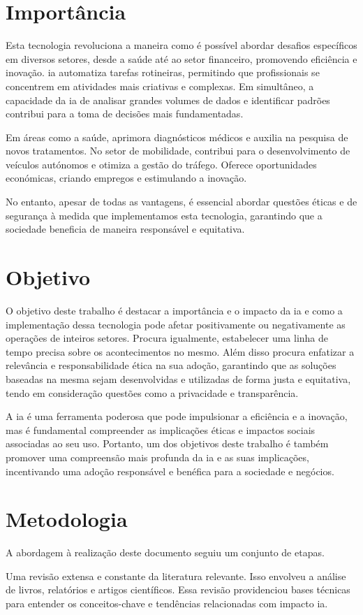 \documentclass[a4paper, 11pt, onecolumn, oneside]{report}
\begin{document}
\section{Importância}
Esta tecnologia revoluciona a maneira como é possível abordar desafios específicos em diversos setores, desde a saúde até ao setor financeiro, promovendo eficiência e inovação. \ac{ia} automatiza tarefas rotineiras, permitindo que profissionais se concentrem em atividades mais criativas e complexas. Em simultâneo, a capacidade da \ac{ia} de analisar grandes volumes de dados e identificar padrões contribui para a toma de decisões mais fundamentadas. 
\par
Em áreas como a saúde, aprimora diagnósticos médicos e auxilia na pesquisa de novos tratamentos. No setor de mobilidade, contribui para o desenvolvimento de veículos autónomos e otimiza a gestão do tráfego. Oferece oportunidades económicas, criando empregos e estimulando a inovação. 
\par 
No entanto, apesar de todas as vantagens, é essencial abordar questões éticas e de segurança à medida que implementamos esta tecnologia, garantindo que a sociedade beneficia de maneira responsável e equitativa.

\section{Objetivo}
O objetivo deste trabalho é destacar a importância e o impacto da \ac{ia} e como a implementação dessa tecnologia pode afetar positivamente ou negativamente as operações de inteiros setores. Procura igualmente, estabelecer uma linha de tempo precisa sobre os acontecimentos no mesmo. Além disso procura enfatizar a relevância e responsabilidade ética na sua adoção, garantindo que as soluções baseadas na mesma sejam desenvolvidas e utilizadas de forma justa e equitativa, tendo em consideração questões como a privacidade e transparência.
\par 
A \ac{ia} é uma ferramenta poderosa que pode impulsionar a eficiência e a inovação, mas é fundamental compreender as implicações éticas e impactos sociais associadas ao seu uso. Portanto, um dos objetivos deste trabalho é também promover uma compreensão mais profunda da \ac{ia} e as suas implicações, incentivando uma adoção responsável e benéfica para a sociedade e negócios.

\section{Metodologia}
A abordagem à realização deste documento seguiu um conjunto de etapas.
\par 
Uma revisão extensa e constante da literatura relevante. Isso envolveu a análise de livros, relatórios e artigos científicos. Essa revisão providenciou bases técnicas para entender os conceitos-chave e tendências relacionadas com impacto \ac{ia}.
\end{document}
